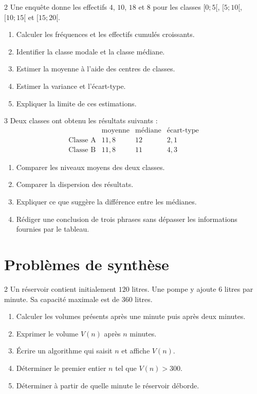 \begin{exo}{2}
Une enquête donne les effectifs $4$, $10$, $18$ et $8$ pour les classes
$[0;5[$, $[5;10[$, $[10;15[$ et $[15;20[$.
\begin{enumerate}
  \item Calculer les fréquences et les effectifs cumulés croissants.
  \item Identifier la classe modale et la classe médiane.
  \item Estimer la moyenne à l'aide des centres de classes.
  \item Estimer la variance et l'écart-type.
  \item Expliquer la limite de ces estimations.
\end{enumerate}
\end{exo}

\begin{exo}{3}
Deux classes ont obtenu les résultats suivants :
\[
\begin{array}{c|ccc}
 & \text{moyenne} & \text{médiane} & \text{écart-type}\\ \hline
\text{Classe A} & 11{,}8 & 12 & 2{,}1\\
\text{Classe B} & 11{,}8 & 11 & 4{,}3
\end{array}
\]
\begin{enumerate}
  \item Comparer les niveaux moyens des deux classes.
  \item Comparer la dispersion des résultats.
  \item Expliquer ce que suggère la différence entre les médianes.
  \item Rédiger une conclusion de trois phrases sans dépasser les informations
  fournies par le tableau.
\end{enumerate}
\end{exo}

\section{Problèmes de synthèse}

\begin{probleme}{2}
Un réservoir contient initialement $120$ litres. Une pompe y ajoute $6$ litres
par minute. Sa capacité maximale est de $360$ litres.
\begin{enumerate}
  \item Calculer les volumes présents après une minute puis après deux minutes.
  \item Exprimer le volume $V(n)$ après $n$ minutes.
  \item Écrire un algorithme qui saisit $n$ et affiche $V(n)$.
  \item Déterminer le premier entier $n$ tel que $V(n)>300$.
  \item Déterminer à partir de quelle minute le réservoir déborde.
\end{enumerate}
\end{probleme}

